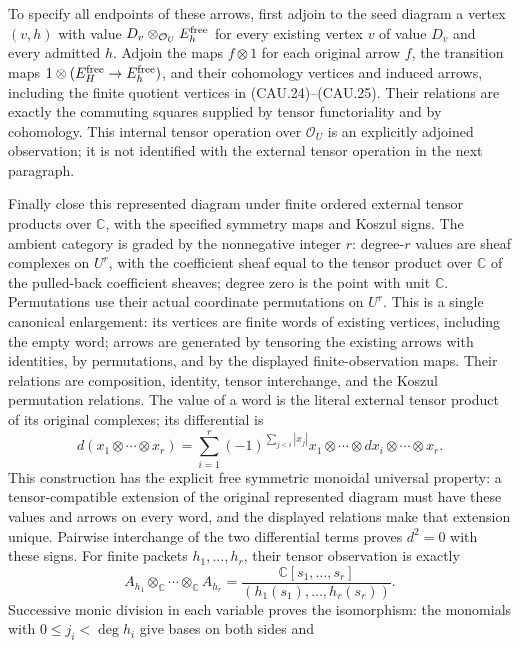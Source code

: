 To specify all endpoints of these arrows, first adjoin to the seed
diagram a vertex $(v,h)$ with value $D_v\otimes_{\mathcal O_U}E_h^{\rm free}$
for every existing vertex $v$ of value $D_v$ and every admitted $h$.
Adjoin the maps $f\otimes1$ for each original arrow $f$, the transition
maps $1\otimes(E_H^{\rm free}\to E_h^{\rm free})$, and their
cohomology vertices and induced arrows, including the finite quotient
vertices in (CAU.24)--(CAU.25).  Their relations are exactly the
commuting squares supplied by tensor functoriality and by cohomology.
This internal tensor operation over $\mathcal O_U$ is an explicitly
adjoined observation; it is not identified with the external tensor
operation in the next paragraph.

Finally close this represented diagram under finite ordered external
tensor products over $\mathbb C$, with the specified symmetry maps
and Koszul signs.  The ambient category is graded by the nonnegative
integer $r$: degree-$r$ values are sheaf complexes on $U^r$, with the
coefficient sheaf equal to the tensor product over $\mathbb C$ of the
pulled-back coefficient sheaves; degree zero is the point with unit
$\mathbb C$.  Permutations use their actual coordinate permutations
on $U^r$.  This is a single canonical enlargement: its vertices
are finite words of existing vertices, including the empty word;
arrows are generated by tensoring the existing arrows with identities,
by permutations, and by the displayed finite-observation maps.  Their
relations are composition, identity, tensor interchange, and the Koszul
permutation relations.  The value of a word is the literal external
tensor product of its original complexes; its differential is
\[
 d(x_1\otimes\cdots\otimes x_r)
 =\sum_{i=1}^r(-1)^{\sum_{j<i}|x_j|}
       x_1\otimes\cdots\otimes dx_i\otimes\cdots\otimes x_r.
                                                               \tag{CAU.26}
\]
This construction has the explicit free symmetric monoidal universal
property: a tensor-compatible extension of the original represented
diagram must have these values and arrows on every word, and the
displayed relations make that extension unique.  Pairwise interchange
of the two differential terms proves $d^2=0$ with these signs.
For finite packets $h_1,\ldots,h_r$, their tensor observation is exactly
\[
 A_{h_1}\otimes_{\mathbb C}\cdots\otimes_{\mathbb C}A_{h_r}
 =\frac{\mathbb C[s_1,\ldots,s_r]}
       {(h_1(s_1),\ldots,h_r(s_r))}.                          \tag{CAU.27}
\]
Successive monic division in each variable proves the isomorphism:
the monomials with $0\le j_i<\deg h_i$ give bases on both sides and
